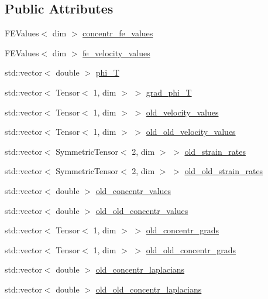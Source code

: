 \subsection*{Public Attributes}
\begin{DoxyCompactItemize}
\item 
F\+E\+Values$<$ dim $>$ \hyperlink{struct_assembly_1_1_scratch_1_1concentr_r_h_s_a9bc67b73e78fc8615584d194c3b85106}{concentr\+\_\+fe\+\_\+values}
\item 
F\+E\+Values$<$ dim $>$ \hyperlink{struct_assembly_1_1_scratch_1_1concentr_r_h_s_ad2de28d5b653c8ee22e96ea33c32c55a}{fe\+\_\+velocity\+\_\+values}
\item 
std\+::vector$<$ double $>$ \hyperlink{struct_assembly_1_1_scratch_1_1concentr_r_h_s_acba65db7ab7aece30027901e3b0f030a}{phi\+\_\+\+T}
\item 
std\+::vector$<$ Tensor$<$ 1, dim $>$ $>$ \hyperlink{struct_assembly_1_1_scratch_1_1concentr_r_h_s_a6168fae7e16f02fb680dd33d4adf7b3c}{grad\+\_\+phi\+\_\+\+T}
\item 
std\+::vector$<$ Tensor$<$ 1, dim $>$ $>$ \hyperlink{struct_assembly_1_1_scratch_1_1concentr_r_h_s_a387df4b1d77c791fa36096d021da90b0}{old\+\_\+velocity\+\_\+values}
\item 
std\+::vector$<$ Tensor$<$ 1, dim $>$ $>$ \hyperlink{struct_assembly_1_1_scratch_1_1concentr_r_h_s_a7914c7c1d8f2232465ff96be67aecc93}{old\+\_\+old\+\_\+velocity\+\_\+values}
\item 
std\+::vector$<$ Symmetric\+Tensor$<$ 2, dim $>$ $>$ \hyperlink{struct_assembly_1_1_scratch_1_1concentr_r_h_s_ac8bb5dab7eeb953de8020714bf306e0c}{old\+\_\+strain\+\_\+rates}
\item 
std\+::vector$<$ Symmetric\+Tensor$<$ 2, dim $>$ $>$ \hyperlink{struct_assembly_1_1_scratch_1_1concentr_r_h_s_ac722877b3d573cc39c3503a9b2607004}{old\+\_\+old\+\_\+strain\+\_\+rates}
\item 
std\+::vector$<$ double $>$ \hyperlink{struct_assembly_1_1_scratch_1_1concentr_r_h_s_a58249a4ae522e0e939e0260983be8e14}{old\+\_\+concentr\+\_\+values}
\item 
std\+::vector$<$ double $>$ \hyperlink{struct_assembly_1_1_scratch_1_1concentr_r_h_s_ab7f32838f72a67cf1fd4a837d790bae9}{old\+\_\+old\+\_\+concentr\+\_\+values}
\item 
std\+::vector$<$ Tensor$<$ 1, dim $>$ $>$ \hyperlink{struct_assembly_1_1_scratch_1_1concentr_r_h_s_a0b35928e795a32329965539123ffe0fd}{old\+\_\+concentr\+\_\+grads}
\item 
std\+::vector$<$ Tensor$<$ 1, dim $>$ $>$ \hyperlink{struct_assembly_1_1_scratch_1_1concentr_r_h_s_a8604e75641eb86196bda5d51d2d0bc02}{old\+\_\+old\+\_\+concentr\+\_\+grads}
\item 
std\+::vector$<$ double $>$ \hyperlink{struct_assembly_1_1_scratch_1_1concentr_r_h_s_ad65f167402d66f381aa6a847e223efc6}{old\+\_\+concentr\+\_\+laplacians}
\item 
std\+::vector$<$ double $>$ \hyperlink{struct_assembly_1_1_scratch_1_1concentr_r_h_s_a42468e166f46196231a07b524345670a}{old\+\_\+old\+\_\+concentr\+\_\+laplacians}
\end{DoxyCompactItemize}


